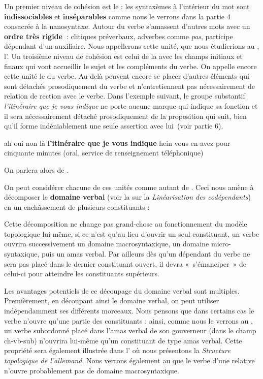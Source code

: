 Un premier niveau de cohésion est le : les syntaxèmes à l’intérieur du mot sont \textbf{indissociables} et \textbf{inséparables} comme nous le verrons dans la partie 4 consacrée à la nanosyntaxe. Autour du verbe s’amassent d’autres mots avec un \textbf{ordre très rigide~}: clitiques préverbaux, adverbes comme \textit{pas}, participe dépendant d’un auxiliaire. Nous appellerons cette unité, que nous étudierions au , l’. Un troisième niveau de cohésion est celui de la  avec les champs initiaux et finaux qui vont accueillir le sujet et les compléments du verbe. On appelle encore cette unité le  du verbe. Au-delà peuvent encore se placer d’autres éléments qui sont détachés prosodiquement du verbe et n’entretiennent pas nécessairement de relation de rection avec le verbe. Dans l’exemple suivant, le groupe substantif \textit{l’itinéraire} \textit{que je vous indique} ne porte aucune marque qui indique sa fonction et il sera nécessairement détaché prosodiquement de la proposition qui suit, bien qu’il forme indéniablement une seule assertion avec lui~(voir partie 6).

\ea
 {ah oui non là} \textbf{{l’itinéraire}  {que je vous indique}}  {hein vous en avez pour cinquante minutes} (oral, service de renseignement téléphonique)
\z

On parlera alors de .

On peut considérer chacune de ces unités comme autant de . Ceci nous amène à décomposer le \textbf{domaine verbal} (voir la  sur la \textit{Linéarisation des codépendants}) en un enchâssement de plusieurs constituants :

\begin{figure}
\caption{\label{fig:}}
\end{figure}

Cette décomposition ne change pas grand-chose au fonctionnement du modèle topologique lui-même, si ce n’est qu’au lieu d’ouvrir un seul constituant, un verbe ouvrira successivement un domaine macrosyntaxique, un domaine micro-syntaxique, puis un amas verbal. Par ailleurs dès qu’un dépendant du verbe ne sera pas placé dans le dernier constituant ouvert, il devra «~s’émanciper~» de celui-ci pour atteindre les constituants supérieurs.

Les avantages potentiels de ce découpage du domaine verbal sont multiples. Premièrement, en découpant ainsi le domaine verbal, on peut utiliser indépendamment ses différents morceaux. Nous pensons que dans certains cas le verbe n’ouvre qu’une partie des constituants : ainsi, comme nous le verrons au , un verbe subordonné placé dans l’amas verbal de son gouverneur (dans le champ ch-vb-sub) n’ouvrira lui-même qu’un constituant de type amas verbal. Cette propriété sera également illustrée dans l’ où nous présentons la \textit{Structure topologique de l’allemand}. Nous verrons également au  que le verbe d’une relative n’ouvre probablement pas de domaine macrosyntaxique.

